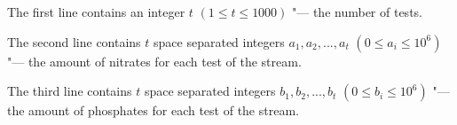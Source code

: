 The first line contains an integer $t$ $(1\le t\le 1000)$ "--- the number of tests.


The second line contains $t$ space separated integers $a_1,a_2,...,a_t$ $(0\le a_i\le 10^6)$ "--- the amount of nitrates for each test of the stream.

The third line contains $t$ space separated integers $b_1,b_2,...,b_t$ $(0\le b_i\le 10^6)$ "--- the amount of phosphates for each test of the stream.
